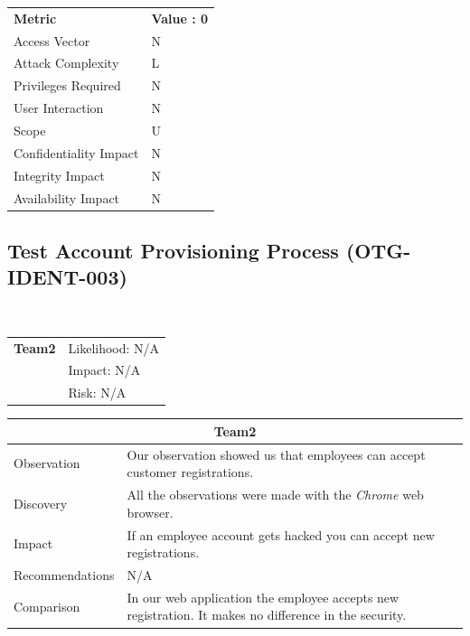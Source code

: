 \documentclass[headsepline,footsepline,footinclude=false,oneside,fontsize=11pt,paper=a4,listof=totoc,bibliography=totoc]{scrbook} %
\begin{document}
\begin{center}
	\begin{tabular}{ll}
		\rowcolor[HTML]{34CDF9}
		{\color[HTML]{ECF4FF} \textbf{Metric}}        & {\color[HTML]{ECF4FF} \textbf{Value : 0}} \\
		\rowcolor[HTML]{BBDAFF}
		{\color[HTML]{333333} Access Vector}          & {\color[HTML]{333333} } N              \\
		\rowcolor[HTML]{ECF4FF}
		{\color[HTML]{333333} Attack Complexity}      & {\color[HTML]{333333} } L              \\
		\rowcolor[HTML]{BBDAFF}
		{\color[HTML]{333333} Privileges Required}    & {\color[HTML]{333333} } N              \\
		\rowcolor[HTML]{ECF4FF}
		{\color[HTML]{333333} User Interaction}       & {\color[HTML]{333333} } N              \\
		\rowcolor[HTML]{BBDAFF}
		{\color[HTML]{333333} Scope}                  & {\color[HTML]{333333} } U              \\
		\rowcolor[HTML]{ECF4FF}
		{\color[HTML]{333333} Confidentiality Impact} & {\color[HTML]{333333} } N              \\
		\rowcolor[HTML]{BBDAFF}
		{\color[HTML]{333333} Integrity Impact}       & {\color[HTML]{333333} } N              \\
		\rowcolor[HTML]{ECF4FF}
		{\color[HTML]{333333} Availability Impact}    & {\color[HTML]{333333} } N
	\end{tabular}
\end{center}
\pagebreak

\subsection{Test Account Provisioning Process (OTG-IDENT-003)}\
\begin{tabular}{cR{12cm}}
	\textbf{Team2} & Likelihood: N/A\\& Impact: N/A\\& Risk: N/A
\end{tabular}

\begin{tabular}{ l|p{11cm}  }
	\hline
	\multicolumn{2}{c}{\textbf{Team2}} \\
	\hline
	Observation   & Our observation showed us that employees can accept customer registrations. \\
	Discovery  & All the observations were made with the \textit{Chrome} web browser. \\
	Impact    & If an employee account gets hacked you can accept new registrations. \\
	Recommendations & N/A \\
	Comparison & In our web application the employee accepts new registration. It makes no difference in the security. \\
	\hline
\end{tabular}
\end{document}
